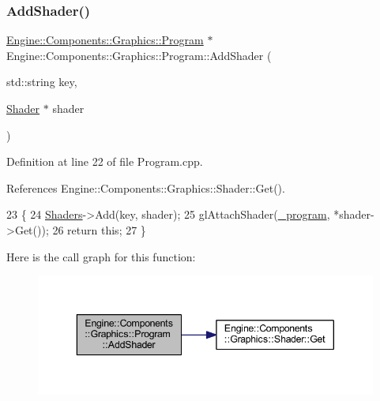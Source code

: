 \subsubsection{\texorpdfstring{Add\+Shader()}{AddShader()}}
{\footnotesize\ttfamily \mbox{\hyperlink{classEngine_1_1Components_1_1Graphics_1_1Program}{Engine\+::\+Components\+::\+Graphics\+::\+Program}} $\ast$ Engine\+::\+Components\+::\+Graphics\+::\+Program\+::\+Add\+Shader (\begin{DoxyParamCaption}\item[{std\+::string}]{key,  }\item[{\mbox{\hyperlink{classEngine_1_1Components_1_1Graphics_1_1Shader}{Shader}} $\ast$}]{shader }\end{DoxyParamCaption})}



Definition at line 22 of file Program.\+cpp.



References Engine\+::\+Components\+::\+Graphics\+::\+Shader\+::\+Get().


\begin{DoxyCode}
23 \{
24     \mbox{\hyperlink{classEngine_1_1Components_1_1Graphics_1_1Program_aff39fa56fc1fab1bce6c8a5ce29ae161}{Shaders}}->Add(key, shader);
25     glAttachShader(\mbox{\hyperlink{classEngine_1_1Components_1_1Graphics_1_1Program_a23fb9432b8cd14e9cfa27e23f483712d}{\_program}}, *shader->Get());
26     \textcolor{keywordflow}{return} \textcolor{keyword}{this};
27 \}
\end{DoxyCode}
Here is the call graph for this function\+:
\nopagebreak
\begin{figure}[H]
\begin{center}
\leavevmode
\includegraphics[width=343pt]{classEngine_1_1Components_1_1Graphics_1_1Program_a95af201a6fab77be50b5fdefbf3bbe63_cgraph}
\end{center}
\end{figure}
\mbox{\label{classEngine_1_1Components_1_1Graphics_1_1Program_ad0db30a829b9492418177179d4ae16e7}} 
